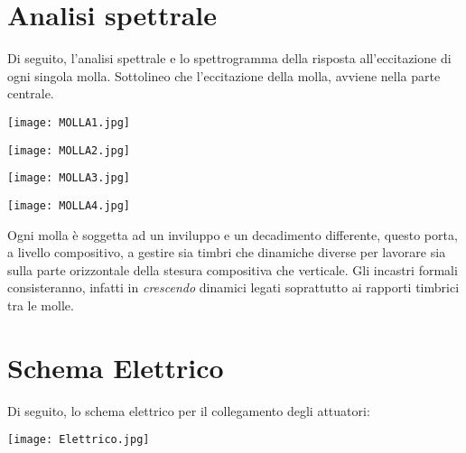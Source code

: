 \section{Analisi spettrale}
Di seguito, l'analisi spettrale e lo spettrogramma della risposta all'eccitazione di ogni singola molla. Sottolineo che l'eccitazione della molla, avviene nella parte centrale. \\
\begin{center}
\begin{minipage}[c]{1.\textwidth}
\texttt{[image: MOLLA1.jpg]}
\end{minipage}
\end{center}
\begin{center}
\begin{minipage}[c]{1.\textwidth}
\texttt{[image: MOLLA2.jpg]}
\end{minipage}
\end{center}
\begin{center}
\begin{minipage}[c]{1.\textwidth}
\texttt{[image: MOLLA3.jpg]}
\end{minipage}
\end{center}
\begin{center}
\begin{minipage}[c]{1.\textwidth}
\texttt{[image: MOLLA4.jpg]}
\end{minipage}
\end{center}

Ogni molla è soggetta ad un inviluppo e un decadimento differente, questo porta, a livello compositivo, a gestire sia timbri che dinamiche diverse per lavorare sia sulla parte orizzontale della stesura compositiva che verticale. Gli incastri formali consisteranno, infatti in \textit{crescendo} dinamici legati soprattutto ai rapporti timbrici tra le molle.


\section{Schema Elettrico}
Di seguito, lo schema elettrico per il collegamento degli attuatori:
\begin{center}
\texttt{[image: Elettrico.jpg]}
\end{center}

